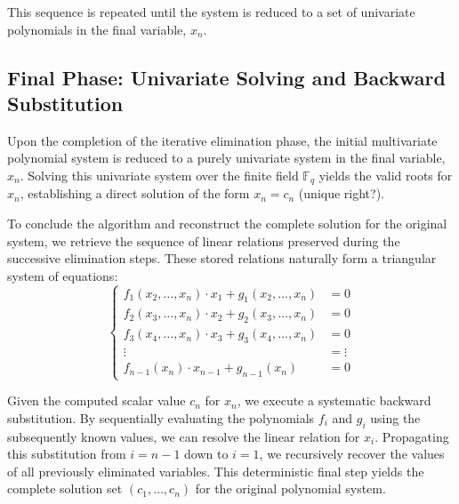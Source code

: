 This sequence is repeated until the system is reduced to a set of univariate polynomials in the final variable, $x_n$.

\subsection{Final Phase: Univariate Solving and Backward Substitution}

Upon the completion of the iterative elimination phase, the initial multivariate polynomial system is reduced to a purely univariate system in the final variable, $x_n$. Solving this univariate system over the finite field $\mathbb{F}_q$ yields the valid roots for $x_n$, establishing a direct solution of the form $x_n = c_n$ (unique right?).

To conclude the algorithm and reconstruct the complete solution for the original system, we retrieve the sequence of linear relations preserved during the successive elimination steps. These stored relations naturally form a triangular system of equations:
\begin{equation}
\left\{
\begin{aligned}
    f_1(x_2, \dots, x_n)\cdot x_1 + g_1(x_2, \dots, x_n) &= 0 \\
    f_2(x_3, \dots, x_n)\cdot x_2 + g_2(x_3, \dots, x_n) &= 0 \\
    f_3(x_4, \dots, x_n)\cdot x_3 + g_3(x_4, \dots, x_n) &= 0 \\
    \vdots &= \vdots \\
    f_{n-1}(x_n)\cdot x_{n-1} + g_{n-1}(x_n) &= 0
\end{aligned}
\right.
\label{eq:system}
\end{equation}

Given the computed scalar value $c_n$ for $x_n$, we execute a systematic backward substitution. By sequentially evaluating the polynomials $f_i$ and $g_i$ using the subsequently known values, we can resolve the linear relation for $x_i$. Propagating this substitution from $i = n-1$ down to $i = 1$, we recursively recover the values of all previously eliminated variables. This deterministic final step yields the complete solution set $(c_1, \dots, c_n)$ for the original polynomial system.



